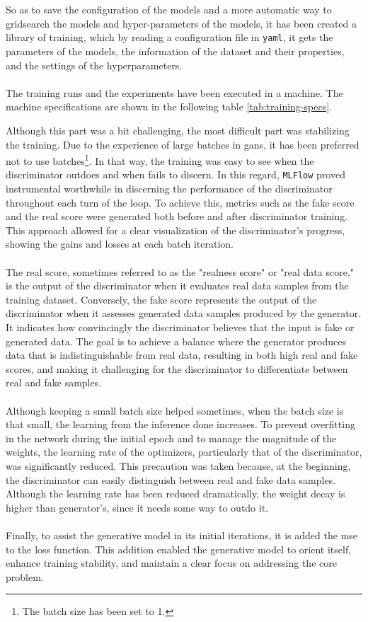 \\
\\
So as to save the configuration of the models and a more automatic way to gridsearch the models and hyper-parameters of the models, it has been created a library of training, which by reading a configuration file in \texttt{yaml}, it gets the parameters of the models, the information of the dataset and their properties, and the settings of the hyperparameters.
\\
\\
The training runs and the experiments have been executed in a machine. The machine specifications are shown in the following table \ref{tab:training-specs}.

Although this part was a bit challenging, the most difficult part was stabilizing the training. Due to the experience of large batches in \gls{gan}s, it has been preferred not to use batches\footnote{The batch size has been set to 1.}. In that way, the training was easy to see when the discriminator outdoes and when fails to discern. In this regard, \texttt{MLFlow} proved instrumental worthwhile in discerning the performance of the discriminator throughout each turn of the loop. To achieve this, metrics such as the fake score and the real score were generated both before and after discriminator training. This approach allowed for a clear visualization of the discriminator's progress, showing the gains and losses at each batch iteration.
\\
\\
The real score, sometimes referred to as the "realness score" or "real data score," is the output of the discriminator when it evaluates real data samples from the training dataset. Conversely, the fake score represents the output of the discriminator when it assesses generated data samples produced by the generator. It indicates how convincingly the discriminator believes that the input is fake or generated data.  The goal is to achieve a balance where the generator produces data that is indistinguishable from real data, resulting in both high real and fake scores, and making it challenging for the discriminator to differentiate between real and fake samples.
\\
\\
Although keeping a small batch size helped sometimes, when the batch size is that small, the learning from the inference done increases. To prevent overfitting in the network during the initial epoch and to manage the magnitude of the weights, the learning rate of the optimizers, particularly that of the discriminator, was significantly reduced. This precaution was taken because, at the beginning, the discriminator can easily distinguish between real and fake data samples. Although the learning rate has been reduced dramatically, the weight decay is higher than generator's, since it needs some way to outdo it.
\\
\\
Finally, to assist the generative model in its initial iterations, it is added the \gls{mse} to the loss function. This addition enabled the generative model to orient itself, enhance training stability, and maintain a clear focus on addressing the core problem.

